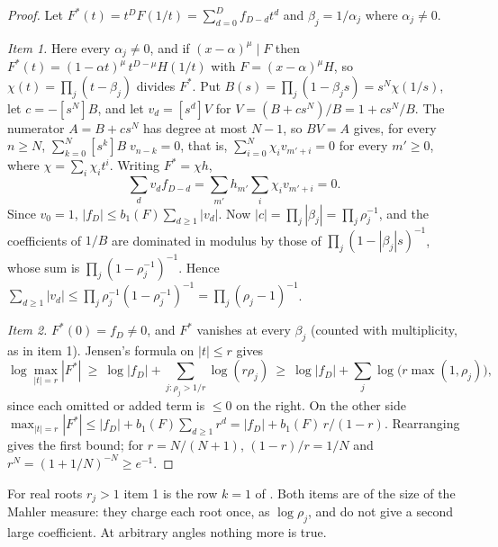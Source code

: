 \documentclass[11pt]{article}
\begin{document}
\begin{proof}
Let $F^*(t)=t^DF(1/t)=\sum_{d=0}^Df_{D-d}t^d$ and $\beta_j=1/\alpha_j$
where $\alpha_j\ne0$.

\emph{Item 1.}  Here every $\alpha_j\ne0$, and if $(x-\alpha)^\mu\mid F$
then $F^*(t)=(1-\alpha t)^\mu\,t^{D-\mu}H(1/t)$ with $F=(x-\alpha)^\mu H$, so
$\chi(t)=\prod_j(t-\beta_j)$ divides $F^*$.  Put
$B(s)=\prod_j(1-\beta_js)=s^N\chi(1/s)$, let $c=-[s^N]B$, and let
$v_d=[s^d]V$ for $V=(B+cs^N)/B=1+cs^N/B$.  The numerator $A=B+cs^N$ has
degree at most $N-1$, so $BV=A$ gives, for every $n\ge N$,
$\sum_{k=0}^N[s^k]B\;v_{n-k}=0$, that is,
$\sum_{i=0}^N\chi_iv_{m'+i}=0$ for every $m'\ge0$, where
$\chi=\sum_i\chi_it^i$.  Writing $F^*=\chi h$,
\[
  \sum_{d}v_df_{D-d}
  =\sum_{m'}h_{m'}\sum_i\chi_iv_{m'+i}=0 .
\]
Since $v_0=1$, $|f_D|\le b_1(F)\sum_{d\ge1}|v_d|$.  Now
$|c|=\prod_j|\beta_j|=\prod_j\rho_j^{-1}$, and the coefficients of $1/B$ are
dominated in modulus by those of $\prod_j(1-|\beta_j|s)^{-1}$, whose sum is
$\prod_j(1-\rho_j^{-1})^{-1}$.  Hence
$\sum_{d\ge1}|v_d|\le\prod_j\rho_j^{-1}(1-\rho_j^{-1})^{-1}
=\prod_j(\rho_j-1)^{-1}$.

\emph{Item 2.}  $F^*(0)=f_D\ne0$, and $F^*$ vanishes at every $\beta_j$
(counted with multiplicity, as in item 1).  Jensen's formula on $|t|\le r$
gives
\[
  \log\max_{|t|=r}|F^*|\ \ge\ \log|f_D|+\sum_{j:\rho_j>1/r}\log(r\rho_j)
  \ \ge\ \log|f_D|+\sum_{j}\log\bigl(r\max(1,\rho_j)\bigr),
\]
since each omitted or added term is $\le0$ on the right.  On the other side
$\max_{|t|=r}|F^*|\le|f_D|+b_1(F)\sum_{d\ge1}r^d
=|f_D|+b_1(F)\,r/(1-r)$.  Rearranging gives the first bound; for
$r=N/(N+1)$, $(1-r)/r=1/N$ and $r^N=(1+1/N)^{-N}\ge e^{-1}$.
\end{proof}

For real roots $r_j>1$ item 1 is the row $k=1$ of \cite[Theorem~3.2]{coefficient-mass}.  Both items
are of the size of the Mahler measure: they charge each root once, as
$\log\rho_j$, and do not give a second large coefficient.  At arbitrary
angles nothing more is true.
\end{document}
